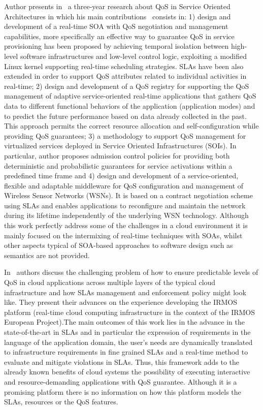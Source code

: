 Author presents in~\cite{anastasi2011} a three-year research about QoS in Service Oriented 
Architectures in which his main contributions~\cite{cucinottaSOA_IA09,Konstanteli:2009:RGF:1632706.1633120,DBLP:conf/compsac/CucinottaAA09} consists in: 1) 
design and development of a real-time SOA with QoS negotiation and management 
capabilities, more specifically an effective way to guarantee QoS in service 
provisioning has been proposed by achieving temporal isolation between 
high-level software infrastructures and low-level control logic, exploiting a 
modified Linux kernel supporting real-time scheduling strategies. SLAs have been 
also extended in order to support QoS attributes related to individual 
activities in real-time; 2) design and development of a QoS registry for 
supporting the QoS management of adaptive service-oriented real-time 
applications that gathers QoS data to different functional behaviors of the 
application (application modes) and to predict the future performance based on 
data already collected in the past. This approach permits the correct resource 
allocation and self-configuration while providing QoS guarantees; 3) a 
methodology to support QoS management for virtualized services deployed in 
Service Oriented Infrastructures (SOIs). In particular, author proposes 
admission control policies for providing both deterministic and probabilistic 
guarantees for service activations within a predefined time frame and 4) design 
and development of a service-oriented, flexible and adaptable middleware for QoS 
configuration and management of Wireless Sensor Networks (WSNs). It is based on 
a contract negotiation scheme using SLAs and enables applications to reconfigure 
and maintain the network during its lifetime independently of the underlying WSN 
technology. Although this work perfectly address some of the challenges in a 
cloud environment it is mainly focused on the intermixing of real-time 
techniques with SOAs, whilst other aspects typical of SOA-based approaches to 
software design such as semantics are not provided.


In~\cite{DBLP:conf/compsac/CucinottaAA10} authors discuss the challenging problem of how to ensure predictable 
levels of QoS in cloud applications across multiple layers of the typical cloud 
infrastructure and how SLAs management and enforcement policy might look like. 
They present their advances on the experience developing the IRMOS platform 
(real-time cloud computing infrastructure in the context of the IRMOS European 
Project).The main outcomes of this work lies in the advance in the 
state-of-the-art in SLAs and in particular the expression of requirements in the 
language of the application domain, the user’s  needs are dynamically translated 
to infrastructure requirements in fine grained SLAs and a real-time method to 
evaluate and mitigate violations in SLAs. Thus, this framework adds to the 
already known benefits of cloud systems the possibility of executing interactive 
and resource-demanding applications with QoS guarantee. Although it is a 
promising platform there is no information on how this platform models the SLAs, 
resources or the QoS features.



